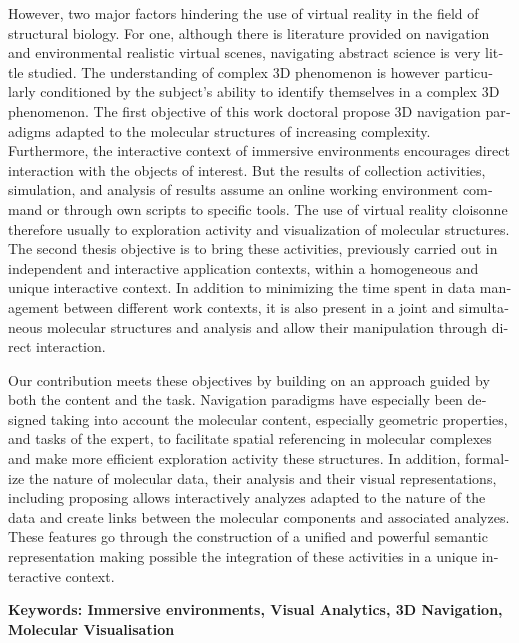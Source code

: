 \begin{otherlanguage}{english}
However, two major factors hindering the use of virtual reality in the field of structural biology. For one, although there is literature provided on navigation and environmental realistic virtual scenes, navigating abstract science is very little studied. The understanding of complex 3D phenomenon is however particularly conditioned by the subject's ability to identify themselves in a complex 3D phenomenon.
The first objective of this work doctoral propose 3D navigation paradigms adapted to the molecular structures of increasing complexity. Furthermore, the interactive context of immersive environments encourages direct interaction with the objects of interest. But the results of collection activities, simulation, and analysis of results assume an online working environment command or through own scripts to specific tools. The use of virtual reality cloisonne therefore usually to exploration activity and visualization of molecular structures. The second thesis objective is to bring these activities, previously carried out in independent and interactive application contexts, within a homogeneous and unique interactive context. In addition to minimizing the time spent in data management between different work contexts, it is also present in a joint and simultaneous molecular structures and analysis and allow their manipulation through direct interaction.

Our contribution meets these objectives by building on an approach guided by both the content and the task. Navigation paradigms have especially been designed taking into account the molecular content, especially geometric properties, and tasks of the expert, to facilitate spatial referencing in molecular complexes and make more efficient exploration activity these structures. In addition, formalize the nature of molecular data, their analysis and their visual representations, including proposing allows interactively analyzes adapted to the nature of the data and create links between the molecular components and associated analyzes. These features go through the construction of a unified and powerful semantic representation making possible the integration of these activities in a unique interactive context.

\textbf{Keywords: Immersive environments, Visual Analytics, 3D Navigation, Molecular Visualisation} 

\end{otherlanguage} 